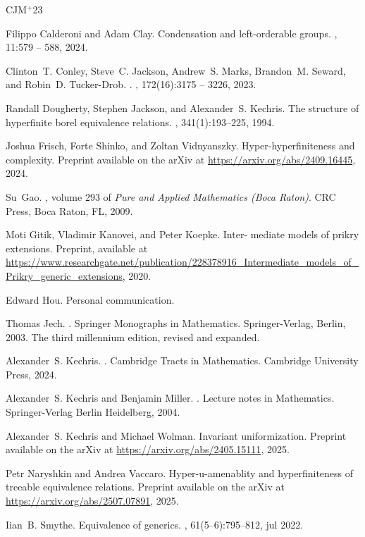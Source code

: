 \documentclass{amsart}
\theoremstyle{definition}
\theoremstyle{remark}
\begin{document}
\newcommand{\etalchar}[1]{$^{#1}$}
\begin{thebibliography}{CJM{\etalchar{+}}23}

Filippo Calderoni and Adam Clay.
\newblock Condensation and left-orderable groups.
, 11:579 -- 588, 2024.

\bibitem[CJM{\etalchar{+}}23]{CJMSTD}
Clinton~T. Conley, Steve~C. Jackson, Andrew~S. Marks, Brandon~M. Seward, and Robin~D. Tucker-Drob.
.
, 172(16):3175 -- 3226, 2023.

Randall Dougherty, Stephen Jackson, and Alexander~S. Kechris.
\newblock The structure of hyperfinite borel equivalence relations.
, 341(1):193--225, 1994.

Joshua Frisch, Forte Shinko, and Zoltan Vidnyanszky.
\newblock Hyper-hyperfiniteness and complexity.
\newblock Preprint available on the arXiv at \url{https://arxiv.org/abs/2409.16445}, 2024.

Su~Gao.
, volume 293 of {\em Pure and Applied Mathematics (Boca Raton)}.
\newblock CRC Press, Boca Raton, FL, 2009.

Moti Gitik, Vladimir Kanovei, and Peter Koepke.
\newblock Inter- mediate models of prikry extensions.
\newblock Preprint, available at \url{https://www.researchgate.net/publication/228378916_Intermediate_models_of_Prikry_generic_extensions}, 2020.

Edward Hou.
\newblock Personal communication.

Thomas Jech.
.
\newblock Springer Monographs in Mathematics. Springer-Verlag, Berlin, 2003.
\newblock The third millennium edition, revised and expanded.

Alexander~S. Kechris.
.
\newblock Cambridge Tracts in Mathematics. Cambridge University Press, 2024.

Alexander~S. Kechris and Benjamin Miller.
.
\newblock Lecture notes in Mathematics. Springer-Verlag Berlin Heidelberg, 2004.

Alexander~S. Kechris and Michael Wolman.
\newblock Invariant uniformization.
\newblock Preprint available on the arXiv at \url{https://arxiv.org/abs/2405.15111}, 2025.

Petr Naryshkin and Andrea Vaccaro.
\newblock Hyper-u-amenablity and hyperfiniteness of treeable equivalence relations.
\newblock Preprint available on the arXiv at \url{https://arxiv.org/abs/2507.07891}, 2025.

Iian~B. Smythe.
\newblock Equivalence of generics.
, 61(5–6):795–812, jul 2022.

\end{thebibliography}
\end{document}
